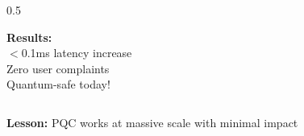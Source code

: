 \documentclass[aspectratio=169,10pt]{beamer}
\newcommand{\teaching}[1]{}
\theoremstyle{plain}
\begin{document}
\begin{frame}
\begin{columns}[T]
\begin{column}{0.5\textwidth}
    
    \vspace{0.5cm}
    
    \begin{greenBox}
      \textbf{Results:}\\
      $<$0.1ms latency increase\\
      Zero user complaints\\
      Quantum-safe today!
    \end{greenBox}
  
    \end{column}
  \end{columns}
  
  \vspace{0.3cm}
  
  \begin{blueBox}
    \textbf{Lesson:} PQC works at massive scale with minimal impact
  \end{blueBox}
  
  \teaching{Prove practical deployment feasibility}
\end{frame}
\end{document}

